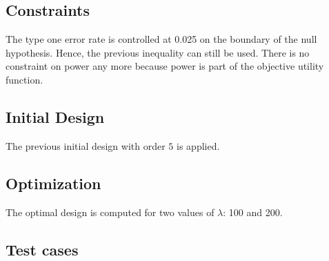 \documentclass[]{book}
\newenvironment{Shaded}{\begin{snugshade}}{\end{snugshade}}
\newcommand{\DataTypeTok}[1]{\textcolor[rgb]{0.13,0.29,0.53}{#1}}
\newcommand{\DecValTok}[1]{\textcolor[rgb]{0.00,0.00,0.81}{#1}}
\newcommand{\KeywordTok}[1]{\textcolor[rgb]{0.13,0.29,0.53}{\textbf{#1}}}
\newcommand{\NormalTok}[1]{#1}
\newcommand{\OperatorTok}[1]{\textcolor[rgb]{0.81,0.36,0.00}{\textbf{#1}}}
\newcommand{\StringTok}[1]{\textcolor[rgb]{0.31,0.60,0.02}{#1}}
\begin{document}
\hypertarget{constraints-11}{%
\subsection{Constraints}\label{constraints-11}}

The type one error rate is controlled at 0.025 on the boundary of the
null hypothesis. Hence, the previous inequality can still be used.
There is no constraint on power any more because power is part of the
objective utility function.

\hypertarget{initial-design-9}{%
\subsection{Initial Design}\label{initial-design-9}}

The previous initial design with order \(5\) is applied.

\hypertarget{optimization-10}{%
\subsection{Optimization}\label{optimization-10}}

The optimal design is computed for two values of \(\lambda\): 100 and 200.

\begin{Shaded}
\end{Shaded}

\hypertarget{test-cases-11}{%
\subsection{Test cases}\label{test-cases-11}}
\end{document}
